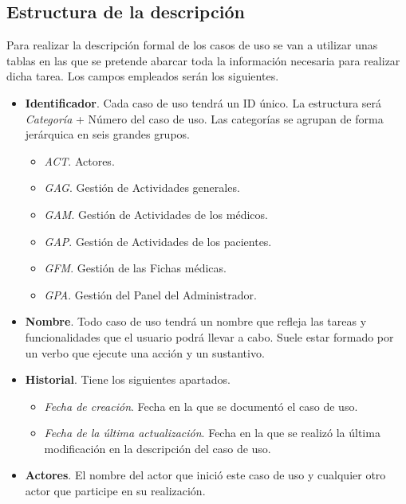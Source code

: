\documentclass[a4paper,oneside,11pt]{book}
\begin{document}
		\subsection{Estructura de la descripción} %
		\label{sub:estructura_de_la_descripcion}
		
			Para realizar la descripción formal de los casos de uso se van a utilizar unas tablas en las que se pretende abarcar toda la información necesaria para realizar dicha tarea. Los campos empleados serán los siguientes.
		
			\begin{itemize}
				\item \textbf{Identificador}. Cada caso de uso tendrá un ID único. La estructura será \textit{Categoría} + Número del caso de uso. Las categorías se agrupan de forma jerárquica en seis grandes grupos.
					\begin{itemize}
						\item \textit{ACT}. Actores.
						\item \textit{GAG}. Gestión de Actividades generales.
						\item \textit{GAM}. Gestión de Actividades de los médicos.
						\item \textit{GAP}. Gestión de Actividades de los pacientes.
						\item \textit{GFM}. Gestión de las Fichas médicas.
						\item \textit{GPA}. Gestión del Panel del Administrador.
					\end{itemize}
				
				\item \textbf{Nombre}. Todo caso de uso tendrá un nombre que refleja las tareas y funcionalidades que el usuario podrá llevar a cabo. Suele estar formado por un verbo que ejecute una acción y un sustantivo.

				\item \textbf{Historial}. Tiene los siguientes apartados.
					\begin{itemize}
						\item \textit{Fecha de creación}. Fecha en la que se documentó el caso de uso.
						\item \textit{Fecha de la última actualización}. Fecha en la que se realizó la última modificación en la descripción del caso de uso.
					\end{itemize}
					
				\item \textbf{Actores}. El nombre del actor que inició este caso de uso y cualquier otro actor que participe en su realización.  
			

\end{itemize}
\end{document}
